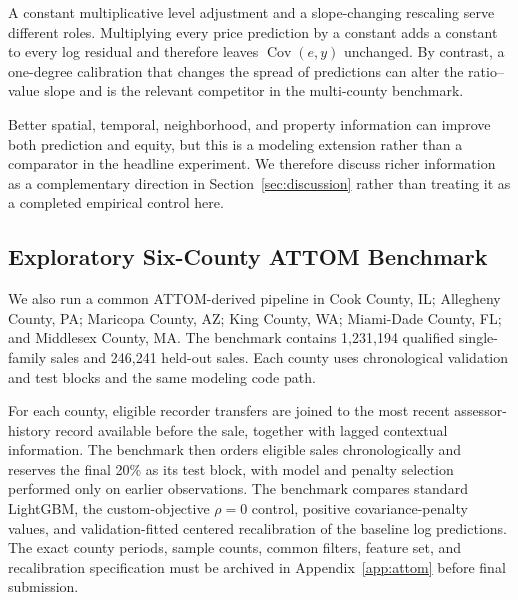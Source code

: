 \documentclass[10pt]{article}
\theoremstyle{definition}
\newcommand{\1}{\mathbf{1}}
\begin{document}
A constant multiplicative level adjustment and a slope-changing rescaling serve different roles. Multiplying every price prediction by a constant adds a constant to every log residual and therefore leaves $\operatorname{Cov}(e,y)$ unchanged. By contrast, a one-degree calibration that changes the spread of predictions can alter the ratio--value slope and is the relevant competitor in the multi-county benchmark.

\textcolor{impGreen}{}


\textcolor{impGreen}{Better spatial, temporal, neighborhood, and property information can improve both prediction and equity, but this is a modeling extension rather than a comparator in the headline experiment. We therefore discuss richer information as a complementary direction in Section~\ref{sec:discussion} rather than treating it as a completed empirical control here.}


\subsection{Exploratory Six-County ATTOM Benchmark}
\label{subsec:attom_design}

We also run a common ATTOM-derived pipeline in Cook County, IL; Allegheny County, PA; Maricopa County, AZ; King County, WA; Miami-Dade County, FL; and Middlesex County, MA. The benchmark contains 1,231,194 qualified single-family sales and 246,241 held-out sales. Each county uses chronological validation and test blocks and the same modeling code path.

\textcolor{impGreen}{For each county, eligible recorder transfers are joined to the most recent assessor-history record available before the sale, together with lagged contextual information. The benchmark then orders eligible sales chronologically and reserves the final 20\% as its test block, with model and penalty selection performed only on earlier observations. The benchmark compares standard LightGBM, the custom-objective $\rho=0$ control, positive covariance-penalty values, and validation-fitted centered recalibration of the baseline log predictions. The exact county periods, sample counts, common filters, feature set, and recalibration specification must be archived in Appendix~\ref{app:attom} before final submission.}
\end{document}
